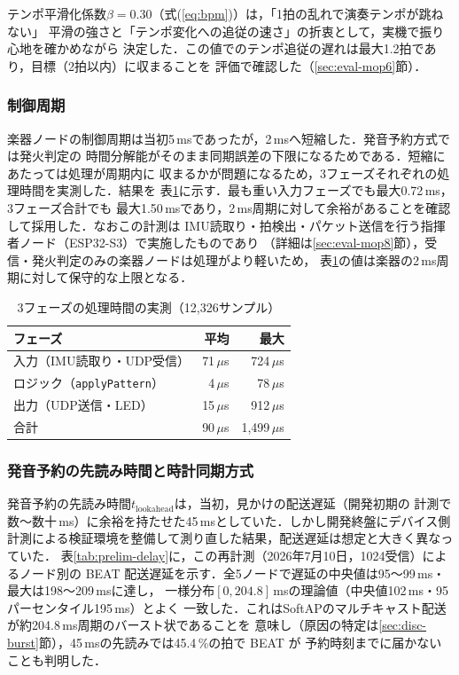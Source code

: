 \documentclass[uplatex,dvipdfmx]{jlreq}
\newcommand{\code}[1]{\texttt{#1}}
\begin{document}
テンポ平滑化係数$\beta=0.30$（式(\ref{eq:bpm})）は，「1拍の乱れで演奏テンポが跳ねない」
平滑の強さと「テンポ変化への追従の速さ」の折衷として，実機で振り心地を確かめながら
決定した．この値でのテンポ追従の遅れは最大1.2拍であり，目標（2拍以内）に収まることを
評価で確認した（\ref{sec:eval-mop6}節）．

\subsubsection{制御周期}\label{sec:prelim-period}

楽器ノードの制御周期は当初5\,msであったが，2\,msへ短縮した．発音予約方式では発火判定の
時間分解能がそのまま同期誤差の下限になるためである．短縮にあたっては処理が周期内に
収まるかが問題になるため，3フェーズそれぞれの処理時間を実測した．結果を
表\ref{tab:phase-time}に示す．最も重い入力フェーズでも最大0.72\,ms，3フェーズ合計でも
最大1.50\,msであり，2\,ms周期に対して余裕があることを確認して採用した．なおこの計測は
IMU読取り・拍検出・パケット送信を行う指揮者ノード（ESP32-S3）で実施したものであり
（詳細は\ref{sec:eval-mop8}節），受信・発火判定のみの楽器ノードは処理がより軽いため，
表\ref{tab:phase-time}の値は楽器の2\,ms周期に対して保守的な上限となる．

\begin{table}[tbp]
  \centering
  \caption{3フェーズの処理時間の実測（12{,}326サンプル）}\label{tab:phase-time}
  \small
  \begin{tabular}{lrr}
    \hline
    フェーズ & 平均 & 最大 \\
    \hline
    入力（IMU読取り・UDP受信） & 71\,$\mu$s & 724\,$\mu$s \\
    ロジック（\code{applyPattern}） & 4\,$\mu$s & 78\,$\mu$s \\
    出力（UDP送信・LED） & 15\,$\mu$s & 912\,$\mu$s \\
    合計 & 90\,$\mu$s & 1{,}499\,$\mu$s \\
    \hline
  \end{tabular}
\end{table}

\subsubsection{発音予約の先読み時間と時計同期方式}\label{sec:prelim-sync}

発音予約の先読み時間$t_{\mathrm{lookahead}}$は，当初，見かけの配送遅延（開発初期の
計測で数〜数十\,ms）に余裕を持たせた45\,msとしていた．しかし開発終盤にデバイス側
計測による検証環境を整備して測り直した結果，配送遅延は想定と大きく異なっていた．
表\ref{tab:prelim-delay}に，この再計測（2026年7月10日，1024受信）によるノード別の
BEAT 配送遅延を示す．全5ノードで遅延の中央値は95〜99\,ms・最大は198〜209\,msに達し，
一様分布$[0, 204.8]$\,msの理論値（中央値102\,ms・95パーセンタイル195\,ms）とよく
一致した．これはSoftAPのマルチキャスト配送が約204.8\,ms周期のバースト状であることを
意味し（原因の特定は\ref{sec:disc-burst}節），45\,msの先読みでは45.4\,\%の拍で BEAT が
予約時刻までに届かないことも判明した．
\end{document}
